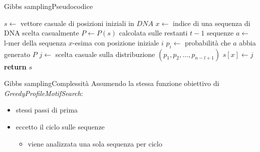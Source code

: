 	\begin{frame}{Gibbs sampling}{Pseudocodice}
		\begin{center}
			\begin{minipage}{11.5cm}
			    \begin{algorithmic}[1]
				    	\State $s\gets$  vettore casuale di posizioni iniziali in $DNA$
				    	\Repeat
				    		\State $x\gets$ indice di una sequenza di DNA scelta casualmente
				    		\State $P\gets P(s)$ calcolata sulle restanti $t-1$ sequenze
				    			\State $a\gets$ l-mer della sequenza $x$-esima con posizione iniziale $i$
				    			\State $p_i\gets $ probabilità che $a$ abbia generato $P$
				    		\EndFor
				    		\State $j\gets$ scelta casuale sulla distribuzione $(p_1,p_2,\dots,p_{n-l+1})$
				    		\State $s[x]\gets j$
				    	\State \textbf{return} $s$
				    \EndProcedure
			    \end{algorithmic}
			\end{minipage}
	    \end{center}
	\end{frame}
	
	\begin{frame}{Gibbs sampling}{Complessità}
		Assumendo la stessa funzione obiettivo di \textit{GreedyProfileMotifSearch}:
		\begin{itemize}
			\item stessi passi di prima
			\item eccetto il ciclo sulle sequenze
			\begin{itemize}
				\item viene analizzata una sola sequenza per ciclo
			\end{itemize}
		\end{itemize}
	\end{frame}
	
